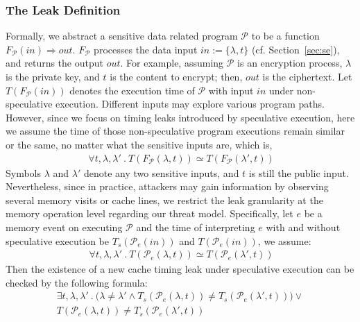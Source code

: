 \documentclass[sigconf,screen]{acmart}
\newcommand{\prog}{\mathcal{P}}
\begin{document}
\subsubsection{The Leak Definition}

Formally, we abstract a sensitive data related program $\prog$ to be a function 
$\mathit{F_{\prog}(in)\Rightarrow out}$. $\mathit{F_{\prog}}$ processes the data 
input $\mathit{in}:=\{\lambda,t\}$ (cf. Section~\ref{sec:se}), and returns the 
output $\mathit{out}$. For example, assuming $\prog$ is an encryption process, 
$\lambda$ is the private key, and $t$ is the content to encrypt; then, $out$ is 
the ciphertext. Let $T(F_{\prog}(in))$ denotes the execution time of $\prog$ with 
input $\mathit{in}$ under non-speculative execution. Different inputs may explore 
various program paths. However, since we focus on timing leaks introduced by 
speculative execution, here we assume the time of those non-speculative program 
executions remain similar or the same, no matter what the sensitive inputs are, 
which is, 
%
\begin{multline} 
  \label{lb:no_leak_std}
  ~~~~~\mathit{\forall t,\lambda,\lambda'~.~T(F_{\prog}(\lambda,t)) \simeq 
  T(F_{\prog}(\lambda',t))}~~~~
\end{multline} 
%
Symbols $\lambda$ and $\lambda'$ denote any two sensitive inputs, and $t$ is still 
the public input. Nevertheless, since in practice, attackers may gain information 
by observing several memory visits or cache lines, we restrict the leak granularity 
at the memory operation level regarding our threat model. Specifically, let $\mathit{e}$ 
be a memory event on executing $\prog$ and the time of interpreting $\mathit{e}$ with 
and without speculative execution be 
$\mathit{T_{s}(\prog_e(in))}$ and $\mathit{T(\prog_e(in))}$, we assume:
%
\begin{multline} 
  \label{lb:no_leak_se}
  ~~~~~\mathit{\forall t,\lambda,\lambda'~.~T(\prog_e(\lambda,t)) \simeq 
  T(\prog_e(\lambda',t))}~~~~
\end{multline} 
%
Then the existence of a new cache timing leak under speculative execution can be 
checked by the following formula: 
%
\begin{multline}
\label{lb:specu_leak}
\mathit{\exists t,\lambda,\lambda'~.~
	\big(
			\lambda \neq \lambda' \wedge T_{s}({\prog_e}(\lambda,t)) 
			\neq T_{s}({\prog_e}(\lambda',t))}
	\big)
	\vee 
	\\  
	T({\prog_e}(\lambda,t)) \neq T_{s}({\prog_e}(\lambda',t)) ~~~
\end{multline}
\end{document}
